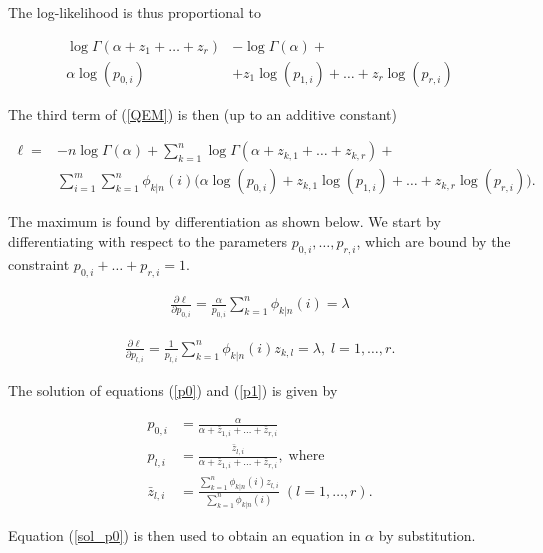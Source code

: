 \documentclass[12pt]{article}
\begin{document}
\begin{appendices}
    The log-likelihood is thus proportional to

    \begin{align*}
      \log\Gamma(\alpha+z_1+\ldots+z_r) &- \log\Gamma(\alpha) + \\
      \alpha\log(p_{0,i}) &+ z_1 \log(p_{1,i}) + \ldots +
      z_r \log(p_{r,i})
    \end{align*}

    The third term of (\ref{QEM}) is then (up to an additive
    constant)

    \begin{align}
      \ell = &-n \log\Gamma(\alpha) + \sum_{k=1}^n
      \log\Gamma(\alpha+z_{k,1}+\ldots+z_{k,r}) + \\
      &\sum_{i=1}^m\sum_{k=1}^n \phi_{k|n}(i) \Big(\alpha\log(p_{0,i}) +
      z_{k,1}\log(p_{1,i}) + \ldots + z_{k,r}\log(p_{r,i}) \Big).
\label{expl_nm}
    \end{align}

    The maximum is found by differentiation as shown below. We
    start by differentiating with respect to the parameters
    $p_{0,i}, \ldots, p_{r,i}$, which are bound by the constraint
    $p_{0,i} + \ldots + p_{r,i} = 1$.

    \begin{align}
      \frac{\partial \ell}{\partial p_{0,i}} = 
      \frac{\alpha}{p_{0,i}} \sum_{k=1}^n \phi_{k|n}(i)
      = \lambda
\label{p0}
    \end{align}

    \begin{align}
      \frac{\partial \ell}{\partial p_{l,i}} = 
      \frac{1}{p_{l,i}} \sum_{k=1}^n \phi_{k|n}(i) z_{k,l} = \lambda,
    \; l = 1, \ldots, r.
\label{p1}
    \end{align}

    The solution of equations (\ref{p0}) and (\ref{p1}) is given by

    \begin{align}
    p_{0,i} &= \frac{\alpha}{\alpha + \bar{z}_{1,i} +
      \ldots + \bar{z}_{r,i}} \label{sol_p0} \\
    p_{l,i} &= \frac{\bar{z}_{l,i}}{\alpha + \bar{z}_{1,i} +
      \ldots + \bar{z}_{r,i}}, \; \text{where} \\
    \bar{z}_{l,i} &= \frac{\sum_{k=1}^n\phi_{k|n}(i)z_{l,i}}
      {\sum_{k=1}^n\phi_{k|n}(i)}\; (l = 1, \ldots, r).
    \end{align}


    Equation (\ref{sol_p0}) is then used to obtain an equation in
    $\alpha$ by substitution.


\end{appendices}
\end{document}
